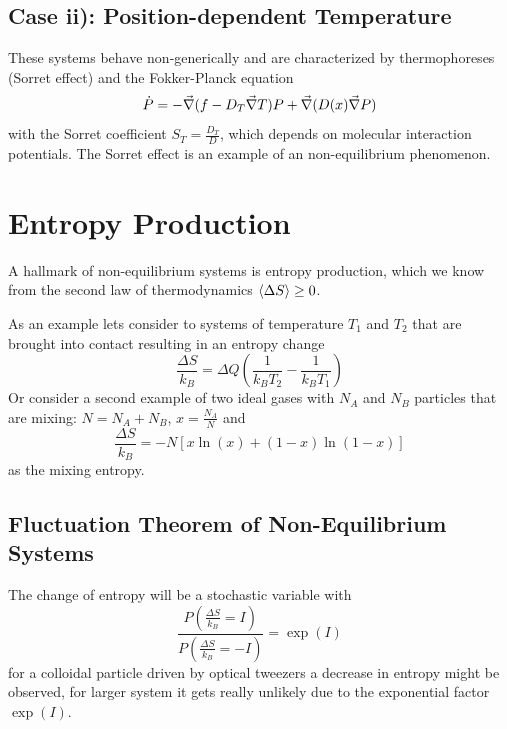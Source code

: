 \documentclass{/home/ben/Templates/notebook}
\begin{document}
	\subsection*{Case ii): Position-dependent Temperature}
	
	These systems behave non-generically and are characterized by thermophoreses (Sorret effect) and the Fokker-Planck equation
	\begin{equation}
	\dot{P} = - \vec{\nabla}(f -D_T \vec{\nabla} T)P + \vec{\nabla}(D(x)\vec{\nabla} P)
	\end{equation}
	with the Sorret coefficient $S_T = \frac{D_T}{D}$, which depends on molecular interaction potentials. The Sorret effect is an example of an non-equilibrium phenomenon. 
	
	\section{Entropy Production}
	
	A hallmark of non-equilibrium systems is entropy production, which we know from the second law of thermodynamics $\expval{\Delta S} \geq 0$.
	
	As an example lets consider to systems of temperature $T_1$ and $T_2$ that are brought into contact resulting in an entropy change
	\begin{equation}
	\frac{\Delta S}{k_B} = \Delta Q (\frac{1}{k_B T_2} - \frac{1}{k_B T_1})
	\end{equation}
	Or consider a second example of two ideal gases with $N_A$ and $N_B$ particles that are mixing: $N = N_A + N_B$, $x = \frac{N_A}{N}$ and 
	\begin{equation}
	\frac{\Delta S}{k_B} = - N [x \ln(x) + (1-x)\ln(1-x)]
	\end{equation}
	as the mixing entropy.
	
	\subsection*{Fluctuation Theorem of Non-Equilibrium Systems}
	
	The change of entropy will be a stochastic variable with 
	\begin{equation}
	\frac{P \left(\frac{\Delta S}{k_B} = I \right)}{P \left(\frac{\Delta S}{k_B} = -I \right)} = \exp(I)
	\end{equation}
	for a colloidal particle driven by optical tweezers a decrease in entropy might be observed, for larger system it gets really unlikely due to the exponential factor $\exp(I)$.
	
\end{document}
